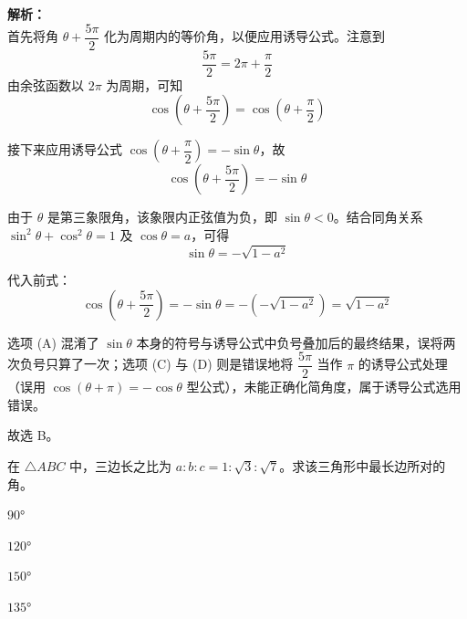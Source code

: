 \documentclass[12pt,a4paper]{exam-zh}
\begin{document}
\begin{solution}
    \textbf{解析：} \\
    首先将角 $\theta + \dfrac{5\pi}{2}$ 化为周期内的等价角，以便应用诱导公式。注意到
    \[ \displaystyle \frac{5\pi}{2} = 2\pi + \frac{\pi}{2} \]
    由余弦函数以 $2\pi$ 为周期，可知
    \[ \displaystyle \cos\left(\theta + \frac{5\pi}{2}\right) = \cos\left(\theta + \frac{\pi}{2}\right) \]

    接下来应用诱导公式 $\cos\left(\theta + \dfrac{\pi}{2}\right) = -\sin\theta$，故
    \[ \displaystyle \cos\left(\theta + \frac{5\pi}{2}\right) = -\sin\theta \]

    由于 $\theta$ 是第三象限角，该象限内正弦值为负，即 $\sin\theta < 0$。结合同角关系 $\sin^2\theta + \cos^2\theta = 1$ 及 $\cos\theta = a$，可得
    \[ \displaystyle \sin\theta = -\sqrt{1-a^2} \]

    代入前式：
    \[ \displaystyle \cos\left(\theta + \frac{5\pi}{2}\right) = -\sin\theta = -\left(-\sqrt{1-a^2}\right) = \sqrt{1-a^2} \]

    选项 (A) 混淆了 $\sin\theta$ 本身的符号与诱导公式中负号叠加后的最终结果，误将两次负号只算了一次；选项 (C) 与 (D) 则是错误地将 $\dfrac{5\pi}{2}$ 当作 $\pi$ 的诱导公式处理（误用 $\cos(\theta+\pi) = -\cos\theta$ 型公式），未能正确化简角度，属于诱导公式选用错误。

    故选 B。
\end{solution}

\begin{question}
    在 $\triangle ABC$ 中，三边长之比为 $a : b : c = 1 : \sqrt{3} : \sqrt{7}$。求该三角形中最长边所对的角。\paren[C]
    \begin{choices}
        \item $90°$
        \item $120°$
        \item $150°$
        \item $135°$
    \end{choices}
\end{question}
\end{document}
